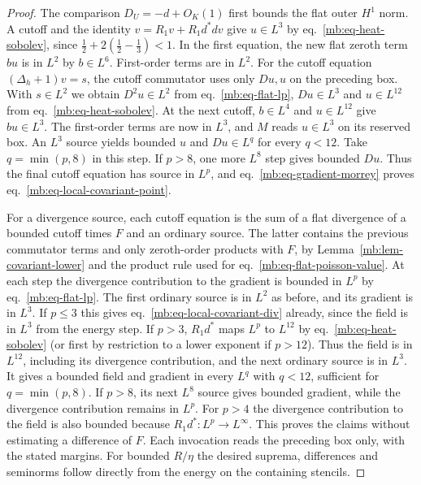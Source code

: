 \documentclass[11pt,letterpaper,reqno]{amsart}
\numberwithin{equation}{section}
\renewcommand{\eqref}[1]{\textup{eq.~\ref{#1}}}
\theoremstyle{definition}
\theoremstyle{remark}
\begin{document}
\begin{proof}
The comparison \(D_U=-d+O_K(1)\) first bounds the flat
outer \(H^1\) norm. A cutoff and the identity
\(v=R_1v+R_1d^*dv\) give \(u\in L^3\) by
\eqref{mb:eq-heat-sobolev}, since
\(\tfrac12+2(\tfrac12-\tfrac13)<1\).
In the first equation, the new flat zeroth term \(bu\)
is in \(L^2\) by \(b\in L^6\). First-order terms are in \(L^2\).
For the cutoff equation \((\Delta_h+1)v=s\), the cutoff
commutator uses only \(Du,u\) on the preceding box.
With \(s\in L^2\) we obtain \(D^2u\in L^2\) from
\eqref{mb:eq-flat-lp}, \(Du\in L^3\) and \(u\in L^{12}\)
from \eqref{mb:eq-heat-sobolev}.
At the next cutoff, \(b\in L^4\) and \(u\in L^{12}\)
give \(bu\in L^3\). The first-order terms are now in
\(L^3\), and \(M\) reads \(u\in L^3\) on its reserved
box. An \(L^3\) source yields bounded \(u\) and
\(Du\in L^q\) for every \(q<12\).
Take \(q=\min(p,8)\) in this step. If \(p>8\), one more
\(L^8\) step gives bounded \(Du\).
Thus the final cutoff equation has source in \(L^p\),
and \eqref{mb:eq-gradient-morrey} proves
\eqref{mb:eq-local-covariant-point}.

For a divergence source, each cutoff equation is the sum
of a flat divergence of a bounded cutoff times \(F\) and
an ordinary source. The latter contains the previous
commutator terms and only zeroth-order products with \(F\),
by Lemma~\ref{mb:lem-covariant-lower} and the product rule
used for \eqref{mb:eq-flat-poisson-value}.
At each step the divergence contribution to the gradient
is bounded in \(L^p\) by \eqref{mb:eq-flat-lp}.
The first ordinary source is in \(L^2\) as before, and
its gradient is in \(L^3\). If \(p\le3\) this gives
\eqref{mb:eq-local-covariant-div} already, since the field
is in \(L^3\) from the energy step.
If \(p>3\), \(R_1d^*\) maps \(L^p\) to \(L^{12}\)
by \eqref{mb:eq-heat-sobolev} (or first by restriction
to a lower exponent if \(p>12\)).
Thus the field is in \(L^{12}\), including its divergence
contribution, and the next ordinary source is in \(L^3\).
It gives a bounded field and gradient in every \(L^q\)
with \(q<12\), sufficient for \(q=\min(p,8)\).
If \(p>8\), its next \(L^8\) source gives bounded
gradient, while the divergence contribution remains
in \(L^p\). For \(p>4\) the divergence contribution
to the field is also bounded because
\(R_1d^*:L^p\to L^\infty\).
This proves the claims without estimating a difference of \(F\).
Each invocation reads the preceding box only, with
the stated margins. For bounded \(R/\eta\) the desired
suprema, differences and seminorms follow directly
from the energy on the containing stencils.
\end{proof}
\end{document}
